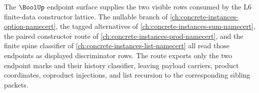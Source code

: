 The $\BoolUp$ endpoint surface supplies the two visible rows consumed by the L6 finite-data constructor lattice. The nullable branch of \autoref{ch:concrete-instances-option-namecert}, the tagged alternatives of \autoref{ch:concrete-instances-sum-namecert}, the paired constructor route of \autoref{ch:concrete-instances-prod-namecert}, and the finite spine classifier of \autoref{ch:concrete-instances-list-namecert} all read those endpoints as displayed discriminator rows. The route exports only the two endpoint marks and their history classifier, leaving payload carriers, product coordinates, coproduct injections, and list recursion to the corresponding sibling packets.
